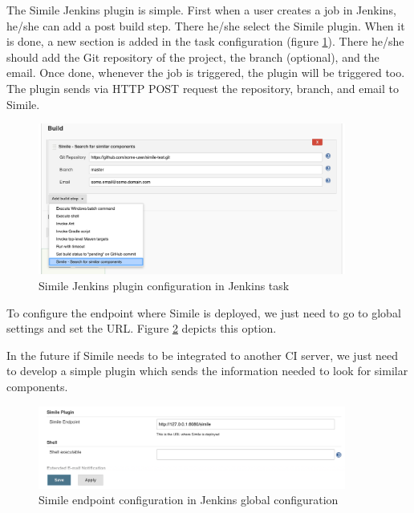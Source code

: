 {The Simile Jenkins plugin is simple. First when a user creates a job in Jenkins, he/she can add a post build step. There he/she select the Simile plugin. When it is done, a new section is added in the task configuration (figure \ref{fig:simile-conf-01}). There he/she should add the Git repository of the project, the branch (optional), and the email. Once done, whenever the job is triggered, the plugin will be triggered too. The plugin sends via HTTP POST request the repository, branch, and email to Simile.

\begin{figure}[H]
	\centering
    \includegraphics[width=0.9\textwidth]{grafiken/simile-conf-01}
    \caption{Simile Jenkins plugin configuration in Jenkins task}
    \label{fig:simile-conf-01}
\end{figure}

To configure the endpoint where Simile is deployed, we just need to go to global settings and set the URL. Figure \ref{fig:simile-conf-02} depicts this option.

In the future if Simile needs to be integrated to another CI server, we just need to develop a simple plugin which sends the information needed to look for similar components.

\begin{figure}[H]
	\centering
    \includegraphics[width=0.9\textwidth]{grafiken/simile-conf-02}
    \caption{Simile endpoint configuration in Jenkins global configuration}
    \label{fig:simile-conf-02}
\end{figure}

}

